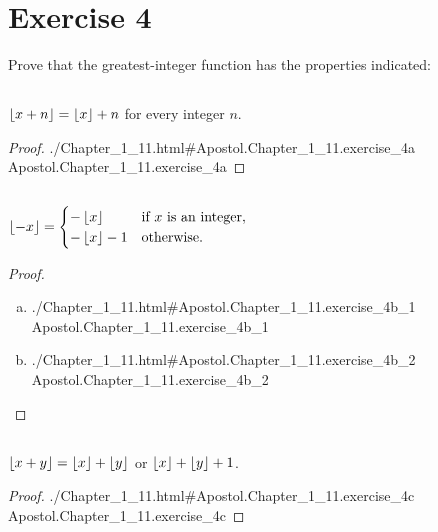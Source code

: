 \documentclass{article}
\newcommand{\lean}[1]{\leanref
  {./Chapter\_1\_11.html\#Apostol.Chapter\_1\_11.#1}
  {Apostol.Chapter\_1\_11.#1}}
\begin{document}

\section*{Exercise 4}%
%

Prove that the greatest-integer function has the properties indicated:

\subsection*{}%
%

$\left\lfloor x + n\right\rfloor = \left\lfloor x\right\rfloor + n$ for every integer $n$.

\begin{proof}

  \lean{exercise\_4a}

\end{proof}

\subsection*{}%
%

$\left\lfloor-x\right\rfloor =
  \begin{cases}
    -\left\lfloor x\right\rfloor & \text{if } x \text{ is an integer}, \\
    -\left\lfloor x\right\rfloor - 1 & \text{otherwise}.
  \end{cases}$

\begin{proof}

  \  %

  \begin{enumerate}[(a)]
    \item \lean{exercise\_4b\_1}
    \item \lean{exercise\_4b\_2}
  \end{enumerate}

\end{proof}

\subsection*{}%
%

$\left\lfloor x + y\right\rfloor = \left\lfloor x\right\rfloor + \left\lfloor y\right\rfloor$ or $\left\lfloor x\right\rfloor + \left\lfloor y\right\rfloor + 1$.

\begin{proof}

  \lean{exercise\_4c}

\end{proof}
\end{document}
